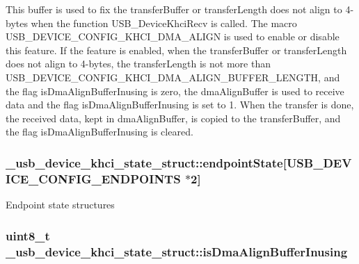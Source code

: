 This buffer is used to fix the transfer\-Buffer or transfer\-Length does not align to 4-\/bytes when the function U\-S\-B\-\_\-\-Device\-Khci\-Recv is called. The macro U\-S\-B\-\_\-\-D\-E\-V\-I\-C\-E\-\_\-\-C\-O\-N\-F\-I\-G\-\_\-\-K\-H\-C\-I\-\_\-\-D\-M\-A\-\_\-\-A\-L\-I\-G\-N is used to enable or disable this feature. If the feature is enabled, when the transfer\-Buffer or transfer\-Length does not align to 4-\/bytes, the transfer\-Length is not more than U\-S\-B\-\_\-\-D\-E\-V\-I\-C\-E\-\_\-\-C\-O\-N\-F\-I\-G\-\_\-\-K\-H\-C\-I\-\_\-\-D\-M\-A\-\_\-\-A\-L\-I\-G\-N\-\_\-\-B\-U\-F\-F\-E\-R\-\_\-\-L\-E\-N\-G\-T\-H, and the flag is\-Dma\-Align\-Buffer\-Inusing is zero, the dma\-Align\-Buffer is used to receive data and the flag is\-Dma\-Align\-Buffer\-Inusing is set to 1. When the transfer is done, the received data, kept in dma\-Align\-Buffer, is copied to the transfer\-Buffer, and the flag is\-Dma\-Align\-Buffer\-Inusing is cleared. \hypertarget{struct__usb__device__khci__state__struct_a04b55a56698a07b05dcad52cb1a4c766}{
\subsubsection[{endpoint\-State}]{ \-\_\-usb\-\_\-device\-\_\-khci\-\_\-state\-\_\-struct\-::endpoint\-State\mbox{[}U\-S\-B\-\_\-\-D\-E\-V\-I\-C\-E\-\_\-\-C\-O\-N\-F\-I\-G\-\_\-\-E\-N\-D\-P\-O\-I\-N\-T\-S $\ast$2\mbox{]}}}\label{struct__usb__device__khci__state__struct_a04b55a56698a07b05dcad52cb1a4c766}
Endpoint state structures \hypertarget{struct__usb__device__khci__state__struct_a6df4a75d1ffb3f399e2323d6f14096be}{
\subsubsection[{is\-Dma\-Align\-Buffer\-Inusing}]{\setlength{\rightskip}{0pt plus 5cm}uint8\-\_\-t \-\_\-usb\-\_\-device\-\_\-khci\-\_\-state\-\_\-struct\-::is\-Dma\-Align\-Buffer\-Inusing}}\label{struct__usb__device__khci__state__struct_a6df4a75d1ffb3f399e2323d6f14096be}
